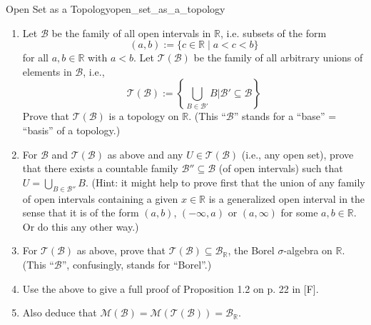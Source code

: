 \begin{mystexercise}{Open Set as a Topology}{open_set_as_a_topology}\label{open_set_as_a_topology}\begin{enumerate}
\item Let $\mathcal{B}$ be the family of all open intervals in $\mathbb{R}$, i.e. subsets of the form
\begin{equation}
(a, b) := \{c \in \mathbb{R} \mid a < c < b\}
\end{equation}
for all $a, b \in \mathbb{R}$ with $a < b$. Let $\mathcal{T}(\mathcal{B})$ be the family of all arbitrary unions of elements in $\mathcal{B}$, i.e.,
\begin{equation}
\mathcal{T}(\mathcal{B}) := \left\{ \bigcup_{B \in \mathcal{B}'} B \mathrel{\Big\vert{}} \mathcal{B}' \subseteq \mathcal{B} \right\}
\end{equation}
Prove that $\mathcal{T}(\mathcal{B})$ is a topology on $\mathbb{R}$. (This ``$\mathcal{B}$'' stands for a ``base'' = ``basis'' of a topology.)


\item For $\mathcal{B}$ and $\mathcal{T}(\mathcal{B})$ as above and any $U \in \mathcal{T}(\mathcal{B})$ (i.e., any open set), prove that there exists a countable family $\mathcal{B}'' \subseteq \mathcal{B}$ (of open intervals) such that $U = \bigcup_{B \in \mathcal{B}''} B$. (Hint: it might help to prove first that the union of any family of open intervals containing a given $x \in \mathbb{R}$ is a generalized open interval in the sense that it is of the form $(a, b)$, $( -\infty, a)$ or $(a, \infty)$ for some $a, b \in \mathbb{R}$. Or do this any other way.)
\item For $\mathcal{T}(\mathcal{B})$ as above, prove that $\mathcal{T}(\mathcal{B}) \subseteq \mathcal{B}_{\mathbb{R}}$, the Borel $\sigma$-algebra on $\mathbb{R}$. (This ``$\mathcal{B}$'', confusingly, stands for ``Borel''.)
\item Use the above to give a full proof of Proposition 1.2 on p. 22 in [F].
\item Also deduce that $\mathcal{M}(\mathcal{B}) = \mathcal{M}(\mathcal{T}(\mathcal{B})) = \mathcal{B}_{\mathbb{R}}$.
\end{enumerate}

\end{mystexercise}
